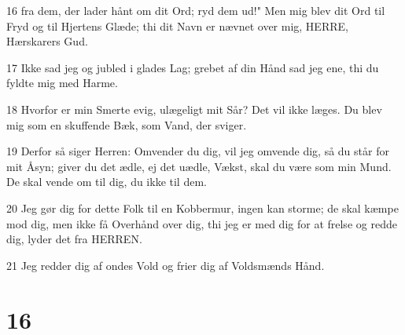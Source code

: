 \par 16 fra dem, der lader hånt om dit Ord; ryd dem ud!" Men mig blev dit Ord til Fryd og til Hjertens Glæde; thi dit Navn er nævnet over mig, HERRE, Hærskarers Gud.
\par 17 Ikke sad jeg og jubled i glades Lag; grebet af din Hånd sad jeg ene, thi du fyldte mig med Harme.
\par 18 Hvorfor er min Smerte evig, ulægeligt mit Sår? Det vil ikke læges. Du blev mig som en skuffende Bæk, som Vand, der sviger.
\par 19 Derfor så siger Herren: Omvender du dig, vil jeg omvende dig, så du står for mit Åsyn; giver du det ædle, ej det uædle, Vækst, skal du være som min Mund. De skal vende om til dig, du ikke til dem.
\par 20 Jeg gør dig for dette Folk til en Kobbermur, ingen kan storme; de skal kæmpe mod dig, men ikke få Overhånd over dig, thi jeg er med dig for at frelse og redde dig, lyder det fra HERREN.
\par 21 Jeg redder dig af ondes Vold og frier dig af Voldsmænds Hånd.

\chapter{16}

